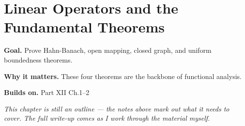 \chapter{Linear Operators and the Fundamental Theorems}
\label{ch:12-functional-analysis-and-spectral-theory-03}

\begin{chapterintro}
\textbf{Goal.} Prove Hahn-Banach, open mapping, closed graph, and uniform boundedness theorems.

\textbf{Why it matters.} These four theorems are the backbone of functional analysis.

\textbf{Builds on.} Part XII Ch.1–2
\end{chapterintro}

\textit{This chapter is still an outline --- the notes above mark out what it needs to cover. The full write-up comes as I work through the material myself.}
